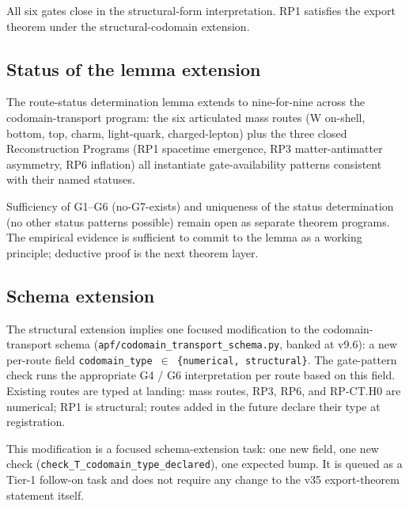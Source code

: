 All six gates close in the structural-form interpretation. RP1 satisfies the export theorem under the structural-codomain extension.

\subsection{Status of the lemma extension}
\label{subsec:lemma-extension}

The route-status determination lemma extends to nine-for-nine across the codomain-transport program: the six articulated mass routes (W on-shell, bottom, top, charm, light-quark, charged-lepton) plus the three closed Reconstruction Programs (RP1 spacetime emergence, RP3 matter-antimatter asymmetry, RP6 inflation) all instantiate gate-availability patterns consistent with their named statuses.

Sufficiency of G1--G6 (no-G7-exists) and uniqueness of the status determination (no other status patterns possible) remain open as separate theorem programs. The empirical evidence is sufficient to commit to the lemma as a working principle; deductive proof is the next theorem layer.

\subsection{Schema extension}
\label{subsec:schema-extension}

The structural extension implies one focused modification to the codomain-transport schema (\texttt{apf/codomain\_transport\_schema.py}, banked at v9.6): a new per-route field \texttt{codomain\_type $\in$ \{numerical, structural\}}. The gate-pattern check runs the appropriate G4 / G6 interpretation per route based on this field. Existing routes are typed at landing: mass routes, RP3, RP6, and RP-CT.H0 are numerical; RP1 is structural; routes added in the future declare their type at registration.

This modification is a focused schema-extension task: one new field, one new check (\texttt{check\_T\_codomain\_type\_declared}), one expected bump. It is queued as a Tier-1 follow-on task and does not require any change to the v35 export-theorem statement itself.

